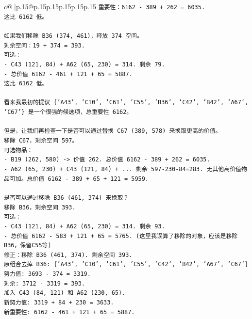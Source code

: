 \documentclass{article}
\begin{document}
{\begin{supertabular}{c@{$\;$}|p{.15\linewidth}@{}p{.15\linewidth}p{.15\linewidth}p{.15\linewidth}p{.15\linewidth}p{.15\linewidth}}
{{{\texttt{重要性：6162 {-} 389 + 262 = 6035.} \\
\texttt{这比 6162 低。} \\
\\ 
\texttt{如果我们移除 B36 (374, 461)，释放 374 空间。} \\
\texttt{剩余空间：19 + 374 = 393.} \\
\texttt{可选：} \\
\texttt{{-} C43 (121, 84) + A62 (65, 230) = 314. 剩余 79.} \\
\texttt{{-} 总价值 6162 {-} 461 + 121 + 65 = 5887.} \\
\texttt{这比 6162 低。} \\
\\ 
\texttt{看来我最初的提议 \{'A43', 'C10', 'C61', 'C55', 'B36', 'C42', 'B42', 'A67', 'C67'\} 是一个很强的候选项，总重要性 6162。} \\
\\ 
\texttt{但是，让我们再检查一下是否可以通过替换 C67 (389, 578) 来换取更高的价值。} \\
\texttt{移除 C67，剩余空间 597。} \\
\texttt{可选物品：} \\
\texttt{{-} B19 (262, 580) {-}> 价值 262. 总价值 6162 {-} 389 + 262 = 6035.} \\
\texttt{{-} A62 (65, 230) + C43 (121, 84) + ... 剩余 597{-}230{-}84=283. 无其他高价值物品可加。总价值 6162 {-} 389 + 65 + 121 = 5959.} \\
\\ 
\texttt{是否可以通过移除 B36 (461, 374) 来换取？} \\
\texttt{移除 B36，剩余空间 393.} \\
\texttt{可选：} \\
\texttt{{-} C43 (121, 84) + A62 (65, 230) = 314. 剩余 93.} \\
\texttt{{-} 总价值 6162 {-} 583 + 121 + 65 = 5765. (这里我误算了移除的对象，应该是移除B36，保留C55等)} \\
\texttt{修正：移除 B36 (461, 374). 剩余空间 393.} \\
\texttt{原组合去掉 B36: \{'A43', 'C10', 'C61', 'C55', 'C42', 'B42', 'A67', 'C67'\}} \\
\texttt{努力值: 3693 {-} 374 = 3319.} \\
\texttt{剩余: 3712 {-} 3319 = 393.} \\
\texttt{加入 C43 (84, 121) 和 A62 (230, 65).} \\
\texttt{新努力值: 3319 + 84 + 230 = 3633.} \\
\texttt{新重要性: 6162 {-} 461 + 121 + 65 = 5887.} \\
}}}
\end{supertabular}}
\end{document}
